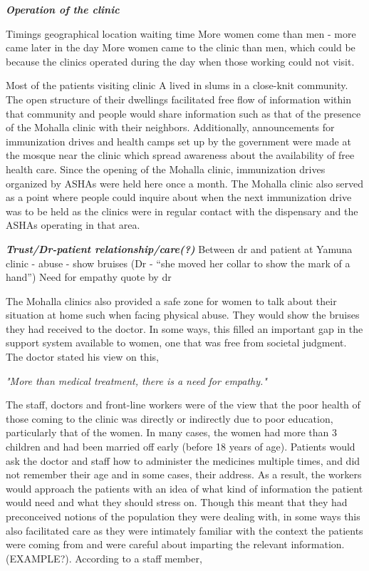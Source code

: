 \textbf{\textit{Operation of the clinic}}

Timings
geographical location
waiting time
	More women come than men - more came later in the day
More women came to the clinic than men, which could be because the clinics operated during the day when those working could not visit.

Most of the patients visiting clinic A lived in slums in a close-knit community. The open structure of their dwellings facilitated free flow of information within that community and people would share information such as that of the presence of the Mohalla clinic with their neighbors. Additionally, announcements for immunization drives and health camps set up by the government were made at the mosque near the clinic which spread awareness about the availability of free health care. Since the opening of the Mohalla clinic, immunization drives organized by ASHAs were held here once a month. The Mohalla clinic also served as a point where people could inquire about when the next immunization drive was to be held as the clinics were in regular contact with the dispensary and the ASHAs operating in that area.

\textbf{\textit{Trust/Dr-patient relationship/care(?)}}
Between dr and patient at Yamuna clinic - abuse - show bruises (Dr - “she moved her collar to show the mark of a hand”) 
Need for empathy quote by dr

The Mohalla clinics also provided a safe zone for women to talk about their situation at home such when facing physical abuse. They would show the bruises they had received to the doctor. In some ways, this filled an important gap in the support system available to women, one that was free from societal judgment. The doctor stated his view on this, 

\textit{"More than medical treatment, there is a need for empathy."}

The staff, doctors and front-line workers were of the view that the poor health of those coming to the clinic was directly or indirectly due to poor education, particularly that of the women. In many cases, the women had more than 3 children and had been married off early (before 18 years of age). Patients would ask the doctor and staff how to administer the medicines multiple times, and did not remember their age and in some cases, their address. As a result, the workers would approach the patients with an idea of what kind of information the patient would need and what they should stress on. Though this meant that they had preconceived notions of the population they were dealing with, in some ways this also facilitated care as they were intimately familiar with the context the patients were coming from and were careful about imparting the relevant information. (EXAMPLE?). According to a staff member,

